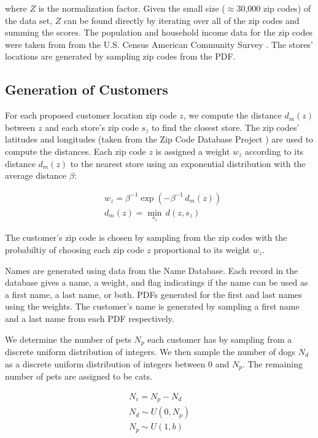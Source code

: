 \documentclass[conference]{IEEEtran}
\begin{document}
where $Z$ is the normalization factor.  Given the small size ($\approx$30,000 zip codes) of the data set, $Z$ can be found directly by iterating over all of the zip codes and summing the scores. The population and household income data for the zip codes were taken from from the U.S. Census American Community Survey \cite{ACS}.  The stores' locations are generated by sampling zip codes from the PDF.

\subsection{Generation of Customers}
For each proposed customer location zip code $z$, we compute the distance $d_m(z)$ between $z$ and each store's zip code $s_z$ to find the closest store.  The zip codes' latitudes and longitudes (taken from the Zip Code Database Project \cite{Zips}) are used to compute the distances. Each zip code $z$ is assigned a weight $w_z$ according to its distance $d_m(z)$ to the nearest store using an exponential distribution with the average distance $\beta$:

\begin{align*}
&w_z = \beta^{-1} \exp(-\beta^{-1} \, d_m(z)) \\
&d_m(z) = \min_{s_z} \, d(z, s_z)
\end{align*}

The customer's zip code is chosen by sampling from the zip codes with the probabiltiy of choosing each zip code $z$ proportional to its weight $w_z$.

Names are generated using data from the Name Database\cite{NameDB}. Each record in the database gives a name, a weight, and flag indicatings if the name can be used as a first name, a last name, or both.  PDFs generated for the first and last names using the weights.  The customer's name is generated by sampling a first name and a last name from each PDF respectively.

We determine the number of pets $N_p$ each customer has by sampling from a discrete uniform distribution of integers. We then sample the number of dogs $N_d$ as a discrete uniform distribution of integers between 0 and $N_p$.  The remaining number of pets are assigned to be cats.

\begin{align*}
N_c = N_p - N_d \\
N_d \sim U(0, N_p) \\
N_p \sim U(1, b)
\end{align*}
\end{document}
